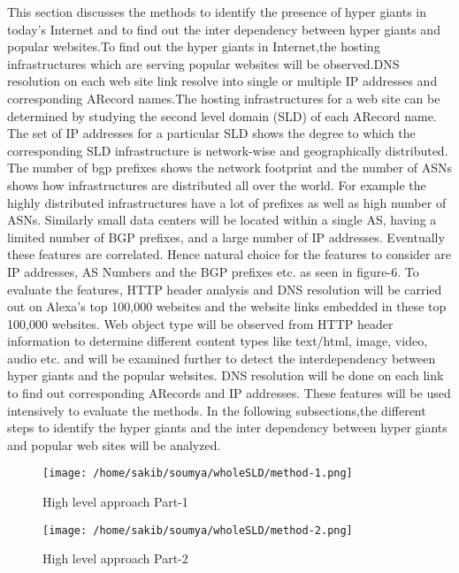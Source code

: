This section discusses the methods to identify the presence of hyper giants in today's Internet and to find out the inter dependency between hyper giants and popular websites.To find out the hyper giants in Internet,the hosting infrastructures which are serving popular websites will be observed.DNS resolution on each web site link resolve into single or multiple  IP addresses and corresponding ARecord names.The hosting infrastructures for a web site can be determined by studying the second level domain (SLD) of each ARecord name. The set of IP addresses for a particular SLD shows the degree to which the corresponding SLD infrastructure is network-wise and geographically distributed. The number of bgp prefixes shows the network footprint and the number of ASNs shows how infrastructures are distributed all over the world. For example the highly distributed infrastructures have a lot of prefixes as well as high number of ASNs. Similarly small data centers will be located within a single AS, having a limited number of BGP prefixes, and a large number of IP addresses. Eventually these features are correlated. Hence natural choice for the features to consider are IP addresses, AS Numbers and the BGP prefixes etc. as seen in figure-6. To evaluate the features, HTTP header analysis and DNS resolution will be carried out on Alexa's top 100,000 websites and the website links embedded in these top 100,000 websites. Web object type will be observed from HTTP header information to determine different content types like text/html, image, video, audio etc. and will be examined further to detect the interdependency between hyper giants and the popular websites. DNS resolution will be done on each link to find out corresponding ARecords and IP addresses. These features will be used intensively to evaluate the methods. In the following subsections,the different steps to identify the hyper giants and the inter dependency between hyper giants and popular web sites will be analyzed. 

\begin{figure}[h]
\texttt{[image: /home/sakib/soumya/wholeSLD/method-1.png]}
\centering
\caption{High level approach Part-1}
\end{figure}

\begin{figure}[h]
\texttt{[image: /home/sakib/soumya/wholeSLD/method-2.png]}
\centering
\caption{High level approach Part-2}
\end{figure}

